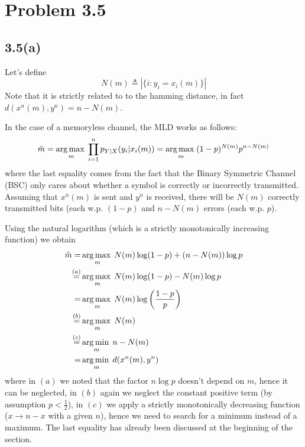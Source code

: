 \section{Problem 3.5}

\subsection{3.5(a)}
Let's define
%
\begin{equation}
N(m) \triangleq \left|\{ i: y_i=x_i(m) \} \right|
\end{equation}
%
Note that it is strictly related to to the hamming distance, in fact $d(x^n(m),y^n) = n-N(m)$.

In the case of a memoryless channel, the MLD works as follows:
%
\begin{equation}
\hat{m} = \operatorname*{arg\,max\;}_m \prod_{i=1}^{n} p_{Y|X}(y_i|x_i(m)) = \operatorname*{arg\,max\;}_m (1-p)^{N(m)} p^{n-N(m)}
\end{equation}
%
where the last equality comes from the fact that the Binary Symmetric Channel (BSC) only cares about whether a symbol is correctly or incorrectly transmitted. Assuming that $x^n(m)$ is sent and $y^n$ is received, there will be $N(m)$ correctly transmitted bits (each w.p. $(1-p)$ and $n-N(m)$ errors (each w.p. $p$).

Using the natural logarithm (which is a strictly monotonically increasing function) we obtain
%
\begin{align}
\begin{split}
\hat{m} =& \operatorname*{arg\,max\;}_m N(m)\log(1-p) + (n-N(m)) \log p\\
\stackrel{(a)}{=}& \operatorname*{arg\,max\;}_m N(m)\log(1-p) -N(m) \log p\\
=& \operatorname*{arg\,max\;}_m N(m)\log\left( \frac{1-p}{p} \right)\\
\stackrel{(b)}{=}& \operatorname*{arg\,max\;}_m N(m)\\
\stackrel{(c)}{=}& \operatorname*{arg\,min\;}_m n-N(m)\\
=& \operatorname*{arg\,min\;}_m d( x^n(m),y^n)
\end{split}
\end{align}
%
where in $(a)$ we noted that the factor $n \log p$ doesn't depend on $m$, hence it can be neglected, in $(b)$ again we neglect the constant positive term (by assumption $p<\frac{1}{2}$), in $(c)$ we apply a strictly monotonically decreasing function ($x \rightarrow n-x$ with a given $n$), hence we need to search for a minimum instead of a maximum. The last equality has already been discussed at the beginning of the section.